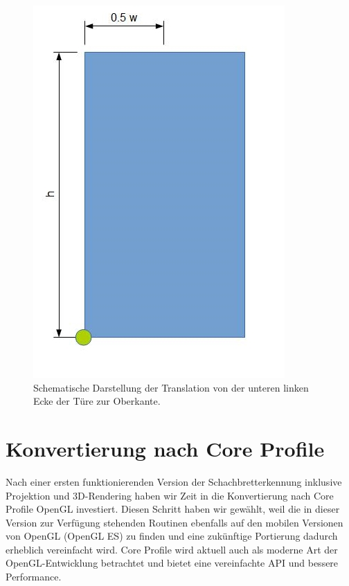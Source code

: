 \begin{figure}[!ht]
\centering
\includegraphics[scale=0.75]{images/opengl-translation.jpg} 
\caption{Schematische Darstellung der Translation von der unteren linken Ecke der Türe zur Oberkante.}
\label{fig:opengl-perspektive}
\end{figure}


\section{Konvertierung nach Core Profile}

Nach einer ersten funktionierenden Version der Schachbretterkennung inklusive Projektion und 3D-Rendering haben wir Zeit in die Konvertierung nach Core Profile OpenGL investiert. Diesen Schritt haben wir gewählt, weil die in dieser Version zur Verfügung stehenden Routinen ebenfalls auf den mobilen Versionen von OpenGL (OpenGL ES) zu finden und eine zukünftige Portierung dadurch erheblich vereinfacht wird. Core Profile wird aktuell auch als moderne Art der OpenGL-Entwicklung betrachtet und bietet eine vereinfachte API und bessere Performance.


